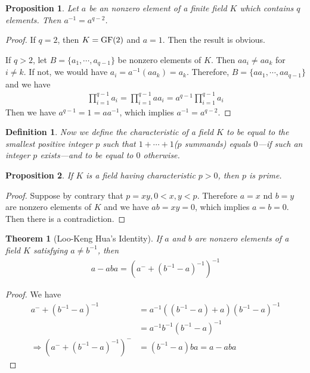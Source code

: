 \documentclass[11pt]{book}
\newtheorem{definition}{Definition}[section]
\newtheorem{theorem}{Theorem}[section]
\newtheorem{proposition}{Proposition}[section]
\theoremstyle{definition}
\numberwithin{equation}{subsection}
\begin{document}
\begin{proposition}
Let $a$ be an nonzero element of a finite field $K$ which contains $q$ elements. Then $a^{-1} = a^{q-2}$.
\end{proposition}
\begin{proof}
If $q = 2$, then $K = {\rm GF}(2)$ and $a = 1$. Then the result is obvious. 

If $q > 2$, let $B = \{a_1, \cdots, a_{q-1}\}$ be nonzero elements of $K$. Then $aa_i\neq aa_k$ for $i\neq k$. If not, we would have $a_i = a^{-1}(aa_k) = a_k$. Therefore, $B = \{a a_1, \cdots, a a_{q-1}\}$ and we have 
\begin{align*}
    \prod^{q-1}_{i=1}a_i = \prod^{q-1}_{i=1}aa_i = a^{q-1}\prod^{q-1}_{i=1}a_i 
\end{align*}
Then we have $a^{q-1} = 1 = a a^{-1}$, which implies $a^{-1} = a^{q-2}$.
\end{proof}

\medskip
\begin{definition}
Now we define the characteristic of a field $K$ to be equal to the smallest positive integer $p$ such that $1+\cdots+1$($p$ summands) equals $0$—if such an integer $p$ exists—and to be equal to $0$ otherwise.
\end{definition}

\medskip

\begin{proposition}
If $K$ is a field having characteristic $p > 0$, then $p$ is prime.
\end{proposition}
\begin{proof}
Suppose by contrary that $p = xy, 0<x,y<p$. Therefore $a = x$ nd $b = y$ are nonzero elements of $K$ and we have $ab = xy = 0$, which implies $a=b=0$. Then there is a contradiction. 
\end{proof}

\medskip

\begin{theorem}[Loo-Keng Hua's Identity]
If $a$ and $b$ are nonzero elements of a field $K$ satisfying $a\neq b^{-1}$, then
\begin{align*}
    a - aba = \left(a^{-} + (b^{-1} - a)^{-1}\right)^{-1}
\end{align*}
\end{theorem}
\begin{proof}
We have
\begin{align*}
    a^{-} + (b^{-1} - a)^{-1} & = a^{-1}\left((b^{-1} - a) + a \right)(b^{-1} - a)^{-1}\\
    & = a^{-1}b^{-1}(b^{-1} - a)^{-1} \\
    \Rightarrow \left(a^{-} + (b^{-1} - a)^{-1}\right)^{-} & = (b^{-1} - a)ba = a - aba
\end{align*}
\end{proof}
\end{document}
